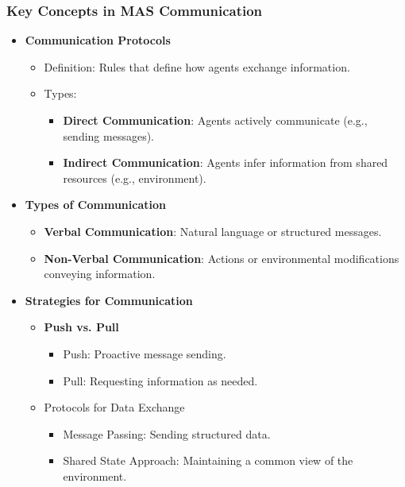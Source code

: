 \documentclass[aspectratio=169]{beamer}
\begin{document}
\begin{frame}[fragile]
    \frametitle{Key Concepts in MAS Communication}
    \begin{itemize}
        \item \textbf{Communication Protocols}
        \begin{itemize}
            \item Definition: Rules that define how agents exchange information.
            \item Types: 
            \begin{itemize}
                \item \textbf{Direct Communication}: Agents actively communicate (e.g., sending messages).
                \item \textbf{Indirect Communication}: Agents infer information from shared resources (e.g., environment).
            \end{itemize}
        \end{itemize}
        
        \item \textbf{Types of Communication}
        \begin{itemize}
            \item \textbf{Verbal Communication}: Natural language or structured messages.
            \item \textbf{Non-Verbal Communication}: Actions or environmental modifications conveying information.
        \end{itemize}
        
        \item \textbf{Strategies for Communication}
        \begin{itemize}
            \item \textbf{Push vs. Pull}
            \begin{itemize}
                \item Push: Proactive message sending.
                \item Pull: Requesting information as needed.
            \end{itemize}
            \item Protocols for Data Exchange
            \begin{itemize}
                \item Message Passing: Sending structured data.
                \item Shared State Approach: Maintaining a common view of the environment.
            \end{itemize}
        \end{itemize}
    \end{itemize}
\end{frame}
\end{document}
